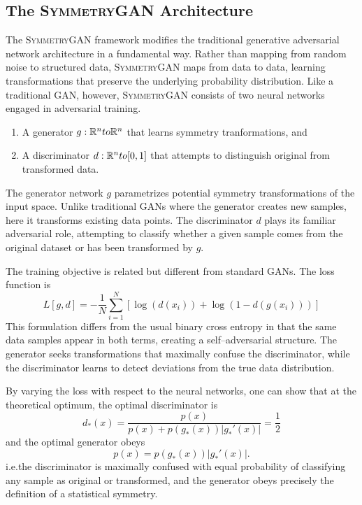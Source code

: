    \subsection{The \textsc{SymmetryGAN} Architecture}
    The \textsc{SymmetryGAN} framework modifies the traditional generative adversarial network architecture in a fundamental way.
    Rather than mapping from random noise to structured data, \textsc{SymmetryGAN} maps from data to data, learning transformations that preserve the underlying probability distribution.
    Like a traditional GAN, however, \textsc{SymmetryGAN} consists of two neural networks engaged in adversarial training.
    \begin{enumerate}
        \item A generator \(g: \mathbb{R}^n to \mathbb{R}^n\) that learns symmetry tranformations, and
        \item A discriminator \(d: \mathbb{R}^n to [0, 1]\) that attempts to distinguish original from transformed data.
    \end{enumerate}
    The generator network \(g\) parametrizes potential symmetry transformations of the input space.
    Unlike traditional GANs where the generator creates new samples, here it transforms existing data points.
    The discriminator \(d\) plays its familiar adversarial role, attempting to classify whether a given sample comes from the original dataset or has been transformed by \(g\).

    The training objective is related but different from standard GANs.
    The loss function is
    \[
        L[g,d] = -\frac{1}{N}\sum_{i=1}^{N}\left[\log(d(x_i)) + \log(1-d(g(x_i)))\right]
    \]
    This formulation differs from the usual binary cross entropy in that the same data samples appear in both terms, creating a self--adversarial structure.
    The generator seeks transformations that maximally confuse the discriminator, while the discriminator learns to detect deviations from the true data distribution.

    By varying the loss with respect to the neural networks, one can show that at the theoretical optimum, the optimal discriminator is
    \[
        d_*(x) = \frac{p(x)}{p(x) + p(g_*(x))|g_*'(x)|} = \frac{1}{2}
    \]
    and the optimal generator obeys
    \[
        p(x) = p(g_*(x))|g_*'(x)|.
    \]
    i.e.the discriminator is maximally confused with equal probability of classifying any sample as original or transformed, and the generator obeys precisely the definition of a statistical symmetry.


